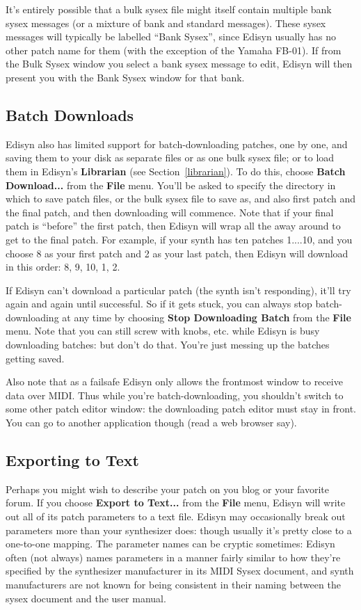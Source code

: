 \documentclass{article}
\begin{document}
It's entirely possible that a bulk sysex file might itself contain multiple bank sysex messages (or a mixture of bank and standard messages).  These sysex messages will typically be labelled ``Bank Sysex'', since Edisyn usually has no other patch name for them (with the exception of the Yamaha FB-01).  If from the Bulk Sysex window you select a bank sysex message to edit, Edisyn will then present you with the Bank Sysex window for that bank. 

\subsection{Batch Downloads}
Edisyn also has limited support for batch-downloading patches, one by one, and saving them to your disk as separate files or as one bulk sysex file; or to load them in Edisyn's {\bf Librarian} (see Section~\ref{librarian}).  To do this, choose {\bf Batch Download...} from the {\bf File} menu.  You'll be asked to specify the directory in which to save patch files, or the bulk sysex file to save as, and also first patch and the final patch, and then downloading will commence.  Note that if your final patch is ``before'' the first patch, then Edisyn will wrap all the away around to get to the final patch.  For example, if your synth has ten patches 1....10, and you choose 8 as your first patch and 2 as your last patch, then Edisyn will download in this order: 8, 9, 10, 1, 2.

If Edisyn can't download a particular patch (the synth isn't responding), it'll try again and again until successful.  So if it gets stuck, 
you can always stop batch-downloading at any time by choosing {\bf Stop Downloading Batch} from the {\bf File} menu.  Note that you can still screw with knobs, etc. while Edisyn is busy downloading batches: but don't do that.  You're just messing up the batches getting saved.%

Also note that as a failsafe Edisyn only allows the frontmost window to receive data over MIDI.  Thus while you're batch-downloading, you shouldn't switch to some other patch editor window: the downloading patch editor must stay in front.  You can go to another application though (read a web browser say).

\subsection{Exporting to Text}
Perhaps you might wish to describe your patch on you blog or your favorite forum.  If you choose {\bf Export to Text...} from the {\bf File} menu, Edisyn will write out all of its patch parameters to a text file.   Edisyn may occasionally break out parameters more than your synthesizer does: though usually it's pretty close to a one-to-one mapping.  The parameter names can be cryptic sometimes: Edisyn often (not always) names parameters in a manner fairly similar to how they're specified by the synthesizer manufacturer in its MIDI Sysex document, and synth manufacturers are not known for being consistent in their naming between the sysex document and the user manual.
\end{document}
